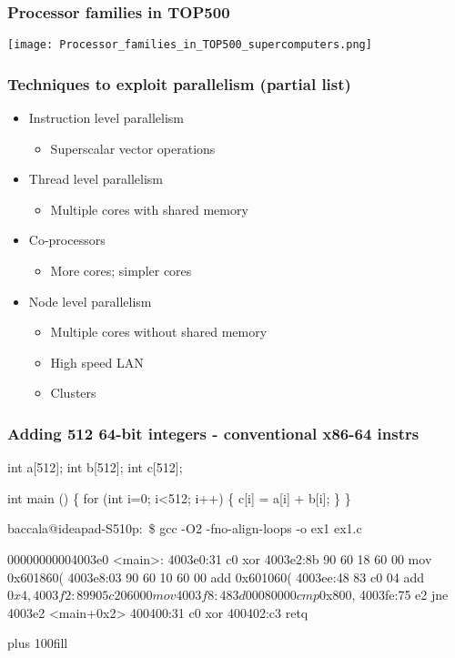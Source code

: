 \documentclass{beamer}
\begin{document}
\begin{frame}
\frametitle{Processor families in TOP500}
\texttt{[image: Processor\_families\_in\_TOP500\_supercomputers.png]}
\end{frame}

\begin{frame}
\frametitle{Techniques to exploit parallelism (partial list)}
\begin{itemize}
\item Instruction level parallelism
\begin{itemize}
\item Superscalar vector operations
\end{itemize}
\item Thread level parallelism
\begin{itemize}
\item Multiple cores with shared memory
\end{itemize}
\item Co-processors
\begin{itemize}
\item More cores; simpler cores
\end{itemize}
\item Node level parallelism
\begin{itemize}
\item Multiple cores without shared memory
\item High speed LAN
\item Clusters
\end{itemize}
\end{itemize}
\end{frame}

\begin{frame}[fragile]
\frametitle{Adding 512 64-bit integers - conventional x86-64 instrs}
\begin{semiverbatim}
\tiny
int a[512];
int b[512];
int c[512];

int main () \{
  for (int i=0; i<512; i++) \{
    c[i] = a[i] + b[i];
  \}
\}


baccala@ideapad-S510p:~\$ gcc -O2 -fno-align-loops -o ex1 ex1.c


00000000004003e0 <main>:
4003e0:31 c0                xor    %
4003e2:8b 90 60 18 60 00    mov    0x601860(%
4003e8:03 90 60 10 60 00    add    0x601060(%
4003ee:48 83 c0 04          add    $0x4,%
4003f2:89 90 5c 20 60 00    mov    %
4003f8:48 3d 00 08 00 00    cmp    $0x800,%
4003fe:75 e2                jne    4003e2 <main+0x2>
400400:31 c0                xor    %
400402:c3                   retq   

\end{semiverbatim}
\vskip 0pt plus 100fill
\end{frame}
\end{document}
